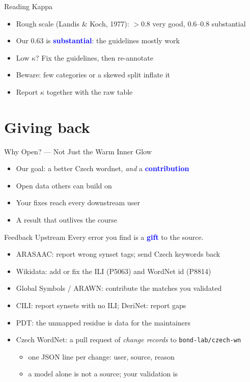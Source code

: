 \documentclass[xetex,aspectratio=169]{beamer}
\newcommand{\txx}[1]{\textbf{\textcolor{blue}{#1}}}
\begin{document}
\begin{frame}{Reading Kappa}
  \begin{itemize}
  \item Rough scale (Landis \& Koch, 1977): $>0.8$ very good, $0.6$--$0.8$ substantial
  \item Our 0.63 is \txx{substantial}: the guidelines mostly work
  \item Low $\kappa$? Fix the guidelines, then re-annotate
  \item Beware: few categories or a skewed split inflate it
  \item Report $\kappa$ together with the raw table
  \end{itemize}
\end{frame}

\section{Giving back}

\begin{frame}{Why Open? --- Not Just the Warm Inner Glow}
  \begin{itemize}
  \item Our goal: a better Czech wordnet, \emph{and} a \txx{contribution}
  \item Open data others can build on
  \item Your fixes reach every downstream user
  \item A result that outlives the course
  \end{itemize}
\end{frame}

\begin{frame}{Feedback Upstream}
  Every error you find is a \txx{gift} to the source.
  \begin{itemize}
  \item ARASAAC: report wrong synset tags; send Czech keywords back
  \item Wikidata: add or fix the ILI (P5063) and WordNet id (P8814)
  \item Global Symbols / ARAWN: contribute the matches you validated
  \item CILI: report synsets with no ILI; DeriNet: report gaps
  \item PDT: the unmapped residue is data for the maintainers
  \item Czech WordNet: a pull request of \emph{change records} to
    \texttt{bond-lab/czech-wn}
    \begin{itemize}
    \item one JSON line per change: user, source, reason
    \item a model alone is not a source; your validation is
    \end{itemize}
  \end{itemize}
\end{frame}
\end{document}
